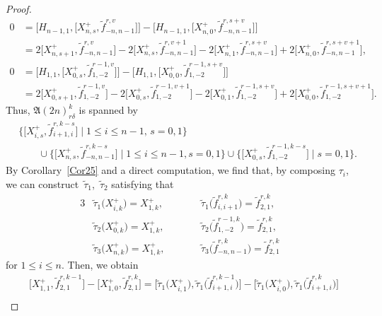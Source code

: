 \documentclass[pdftex]{sigma}
\numberwithin{equation}{section}
\theoremstyle{definition}
\begin{document}
\begin{proof}
\begin{align}
0&=\bigl[H_{n-1,1},\bigl[X^+_{n,s},\widetilde{f}_{-n,n-1}^{r,v}\bigr]\bigr]-\bigl[H_{n-1,1}, \bigl[X^+_{n,0},\widetilde{f}_{-n,n-1}^{r,s+v}\bigr]\bigr]\nonumber\\%
&=2\bigl[X^+_{n,s+1},\widetilde{f}_{-n,n-1}^{r,v}\bigr]-2\bigl[X^+_{n,s},\widetilde{f}_{-n,n-1}^{r,v+1}\bigr] -2\bigl[X^+_{n,1},\widetilde{f}_{-n,n-1}^{r,s+v}\bigr]+2\bigl[X^+_{n,0},\widetilde{f}_{-n,n-1}^{r,s+v+1}\bigr],\nonumber\\
0&=\bigl[H_{1,1},\bigl[X^+_{0,s},\widetilde{f}_{1,-2}^{r-1,v}\bigr]\bigr]-\bigl[H_{1,1},\bigl[X^+_{0,0},\widetilde{f}_{1,-2}^{r-1,s+v}\bigr]\bigr]\nonumber\\%
&=2\bigl[X^+_{0,s+1},\widetilde{f}_{1,-2}^{r-1,v}\bigr]-2\bigl[X^+_{0,s},\widetilde{f}_{1,-2}^{r-1,v+1}\bigr] -2\bigl[X^+_{0,1},\widetilde{f}_{1,-2}^{r-1,s+v}\bigr]+2\bigl[X^+_{0,0},\widetilde{f}_{1,-2}^{r-1,s+v+1}\bigr].\nonumber
\end{align}
Thus, $\mathfrak{A}(2n)_{r\delta}^k$ is spanned by
\begin{align*}
&\{\bigl[X^+_{i,s},\widetilde{f}_{i+1,i}^{r,k-s}\bigr]\mid1\leq i\leq n-1,\,s=0,1\}\\
& \qquad\cup\{\bigl[X^+_{n,s},\widetilde{f}_{-n,n-1}^{r,k-s}\bigr]\mid1\leq i\leq n-1,s=0,1\}\cup\{\bigl[X^+_{0,s},\widetilde{f}_{1,-2}^{r-1,k-s}\bigr]\mid s=0,1\}.
\end{align*}
By Corollary~\ref{Cor25} and a direct computation, we find that, by composing $\tau_i$, we can construct~$\widetilde{\tau}_1$,~$\widetilde{\tau}_2$ satisfying that
\begin{alignat*}{3}
& \widetilde{\tau}_1\bigl(X^+_{i,k}\bigr)=X^+_{1,k},\qquad && \widetilde{\tau}_1\bigl(\widetilde{f}_{i,i+1}^{r,k}\bigr)=\widetilde{f}_{2,1}^{r,k},&\\
&\widetilde{\tau}_2\bigl(X^+_{0,k}\bigr)=X^+_{1,k},\qquad && \widetilde{\tau}_2\bigl(\widetilde{f}_{1,-2}^{r-1,k}\bigr)=\widetilde{f}_{2,1}^{r,k},&\\
&\widetilde{\tau}_3\bigl(X^+_{n,k}\bigr)=X^+_{1,k},\qquad && \widetilde{\tau}_3\bigl(\widetilde{f}_{-n,n-1}^{r,k}\bigr)=\widetilde{f}_{2,1}^{r,k}&
\end{alignat*}
for $1\leq i\leq n$. Then, we obtain
\begin{gather}
\bigl[X^+_{1,1},\widetilde{f}_{2,1}^{r,k-1}\bigr]-\bigl[X^+_{1,0},\widetilde{f}_{2,1}^{r,k}\bigr]
=\bigl[\widetilde{\tau}_1\bigl(X^+_{i,1}\bigr),\widetilde{\tau}_1\bigl(\widetilde{f}_{i+1,i}^{r,k-1}\bigr)\bigr]-\bigl[\widetilde{\tau}_1\bigl(X^+_{i,0}\bigr),\widetilde{\tau}_1\bigl(\widetilde{f}_{i+1,i}^{r,k}\bigr)\bigr]\nonumber\\

\end{gather}
\end{proof}
\end{document}
